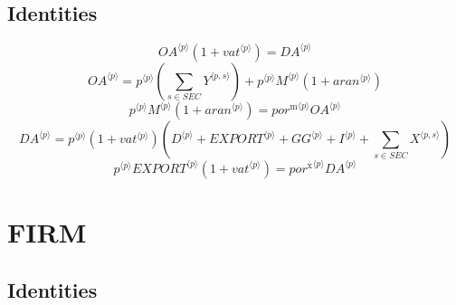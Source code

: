 \subsection{Identities}

\begin{equation}
{{{O\!A}}^{\langle p\rangle}} \left(1 + {{v\!a\!t}}^{\langle p\rangle}\right) = {{D\!A}}^{\langle p\rangle}
\end{equation}
\begin{equation}
{{O\!A}}^{\langle p\rangle} = {{p}^{\langle p\rangle}} \left(\sum_{s\in {S\!E\!C}} {Y}^{\langle p,s\rangle}\right) + {{p}^{\langle p\rangle}} {{M}^{\langle p\rangle}} \left(1 + {{a\!r\!a\!n}}^{\langle p\rangle}\right)
\end{equation}
\begin{equation}
{{p}^{\langle p\rangle}} {{M}^{\langle p\rangle}} \left(1 + {{a\!r\!a\!n}}^{\langle p\rangle}\right) = {{{p\!o\!r}^{\mathrm{m}}}^{\langle p\rangle}} {{{O\!A}}^{\langle p\rangle}}
\end{equation}
\begin{equation}
{{D\!A}}^{\langle p\rangle} = {{p}^{\langle p\rangle}} \left(1 + {{v\!a\!t}}^{\langle p\rangle}\right) \left({D}^{\langle p\rangle} + {{E\!X\!P\!O\!R\!T}}^{\langle p\rangle} + {{G\!G}}^{\langle p\rangle} + {I}^{\langle p\rangle} + \sum_{s\in {S\!E\!C}} {X}^{\langle p,s\rangle}\right)
\end{equation}
\begin{equation}
{{p}^{\langle p\rangle}} {{{E\!X\!P\!O\!R\!T}}^{\langle p\rangle}} \left(1 + {{v\!a\!t}}^{\langle p\rangle}\right) = {{{p\!o\!r}^{\mathrm{x}}}^{\langle p\rangle}} {{{D\!A}}^{\langle p\rangle}}
\end{equation}




\section{FIRM}

\subsection{Identities}


